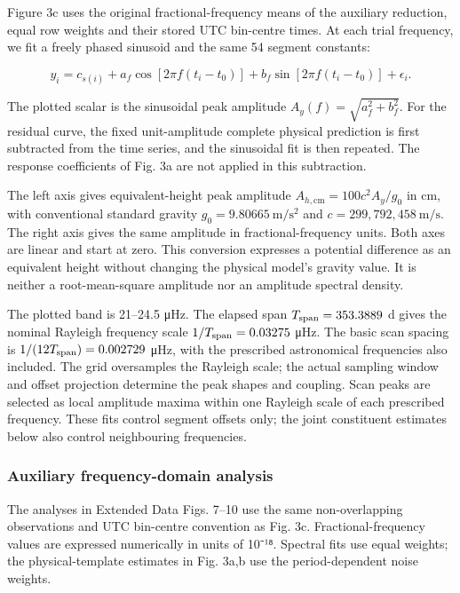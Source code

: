 \documentclass[
  11pt,
  a4paper,
]{article}
\begin{document}
Figure 3c uses the original fractional-frequency means of the auxiliary
reduction, equal row weights and their stored UTC bin-centre times. At
each trial frequency, we fit a freely phased sinusoid and the same 54
segment constants:

\[
y_i=c_{s(i)}+a_f\cos[2\pi f(t_i-t_0)]+b_f\sin[2\pi f(t_i-t_0)]+\epsilon_i.
\]

The plotted scalar is the sinusoidal peak amplitude
\(A_y(f)=\sqrt{a_f^2+b_f^2}\). For the residual curve, the fixed
unit-amplitude complete physical prediction is first subtracted from the
time series, and the sinusoidal fit is then repeated. The response
coefficients of Fig. 3a are not applied in this subtraction.

The left axis gives equivalent-height peak amplitude
\(A_{h,\mathrm{cm}}=100c^2A_y/g_0\) in cm, with conventional standard
gravity \(g_0=9.80665\ \mathrm{m/s^2}\) and
\(c=299,792,458\ \mathrm{m/s}\). The right axis gives the same amplitude
in fractional-frequency units. Both axes are linear and start at zero.
This conversion expresses a potential difference as an equivalent height
without changing the physical model's gravity value. It is neither a
root-mean-square amplitude nor an amplitude spectral density.

The plotted band is 21--24.5 μHz. The elapsed span
\(T_{\rm span}=353.3889\) d gives the nominal Rayleigh frequency scale
\(1/T_{\rm span}=0.03275\) μHz. The basic scan spacing is
\(1/(12T_{\rm span})=0.002729\) μHz, with the prescribed astronomical
frequencies also included. The grid oversamples the Rayleigh scale; the
actual sampling window and offset projection determine the peak shapes
and coupling. Scan peaks are selected as local amplitude maxima within
one Rayleigh scale of each prescribed frequency. These fits control
segment offsets only; the joint constituent estimates below also control
neighbouring frequencies.

\hypertarget{auxiliary-frequency-domain-analysis}{%
\subsubsection{Auxiliary frequency-domain
analysis}\label{auxiliary-frequency-domain-analysis}}

The analyses in Extended Data Figs. 7--10 use the same non-overlapping
observations and UTC bin-centre convention as Fig. 3c.
Fractional-frequency values are expressed numerically in units of 10⁻¹⁸.
Spectral fits use equal weights; the physical-template estimates in Fig.
3a,b use the period-dependent noise weights.
\end{document}
